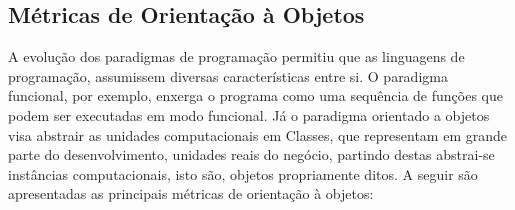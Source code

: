 \subsection{Métricas de Orientação à Objetos}
\label{métrica objetos}

A evolução dos paradigmas de programação permitiu que as linguagens de 
programação, assumissem diversas características entre si. O paradigma 
funcional, por exemplo, enxerga o programa como uma sequência de funções que 
podem ser executadas em modo funcional. Já o paradigma orientado a objetos visa 
abstrair as unidades computacionais em Classes, que representam em grande 
parte do desenvolvimento, unidades reais do negócio, partindo destas abstrai-se instâncias 
computacionais, isto são, objetos propriamente ditos. A seguir são apresentadas 
as principais métricas de orientação à objetos:


